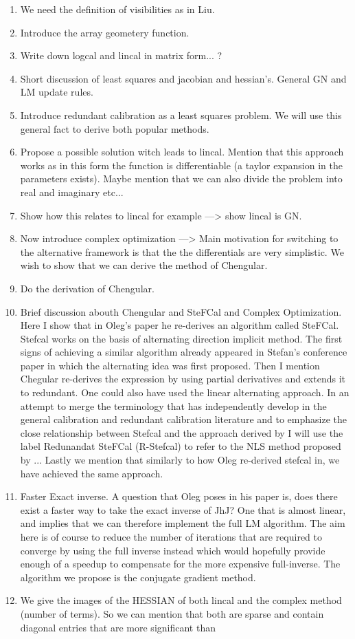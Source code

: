 \documentclass[a4paper,fleqn,usenatbib]{mnras}
\begin{document}
\begin{enumerate}
 \begin{enumerate}
 \item We need the definition of visibilities as in Liu.
 \item Introduce the array geometery function.
 \item Write down logcal and lincal in matrix form... ?
 \item Short discussion of least squares and jacobian and hessian's. General GN and LM update rules.
 \item Introduce redundant calibration as a least squares problem. We will use this general fact to derive both popular methods.
 \item Propose a possible solution witch leads to lincal. Mention that this approach works as in this form the function is differentiable (a taylor expansion in the 
 parameters exists). Maybe mention that we can also divide the problem into real and imaginary etc...
 \item Show how this relates to lincal for example ---> show lincal is GN.
 \item Now introduce complex optimization ---> Main motivation for switching to the alternative framework is that the the differentials are very simplistic. We wish to show that
 we can derive the method of Chengular.
 \item Do the derivation of Chengular. 
 \item Brief discussion abouth Chengular and SteFCal and Complex Optimization. Here I show that in Oleg's paper he re-derives an algorithm called SteFCal. Stefcal works
 on the basis of alternating direction implicit method. The first signs of achieving a similar algorithm already appeared in Stefan's conference paper in which the alternating
 idea was first proposed. Then I mention Chegular re-derives the expression by using partial derivatives and extends it to redundant. One could also have used the linear alternating
 approach. In an attempt to merge the terminology that has independently develop in the general calibration and redundant calibration literature and to emphasize the close
 relationship between Stefcal and the approach derived by I will use the label Redunandat SteFCal (R-Stefcal) to refer to the NLS method proposed by ... Lastly we mention that similarly
 to how Oleg re-derived stefcal in, we have achieved the same approach.
 \item Faster Exact inverse. A question that Oleg poses in his paper is, does there exist a faster way to take the exact inverse of JhJ? One that is almost linear, and
 implies that we can therefore implement the full LM algorithm. The aim here is of course to reduce the number of iterations that are required to converge by using the 
 full inverse instead which would hopefully provide enough of a speedup to compensate for the more expensive full-inverse. The algorithm we propose is the conjugate 
 gradient method.
 \item We give the images of the HESSIAN of both lincal and the complex method (number of terms). So we can mention that both are sparse and contain diagonal entries that 
 are more significant than 
 \end{enumerate}
 

\end{enumerate}
\end{document}
